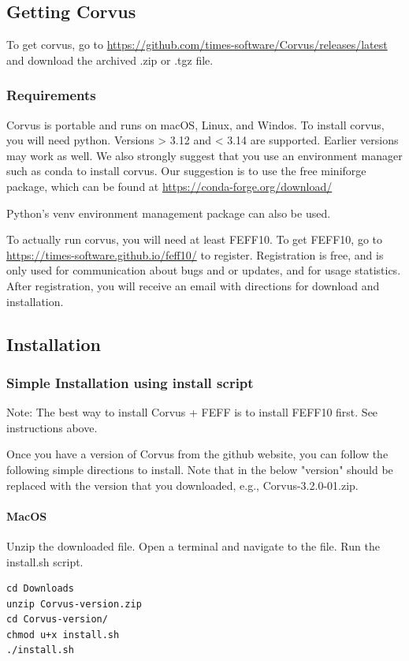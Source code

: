 \subsection{Getting Corvus}
To get corvus, go to 
\url{https://github.com/times-software/Corvus/releases/latest}
and download the archived .zip or .tgz file.

\subsubsection{Requirements}
Corvus is portable and runs on macOS, Linux, and Windos. 
To install corvus, you will need python. Versions > 3.12 and < 3.14 are supported. Earlier versions may work as well. We also strongly suggest that you use
an environment manager such as conda to install corvus. Our suggestion is to
use the free miniforge package, which can be found at \url{https://conda-forge.org/download/}

Python's venv environment management package can also be used.

To actually run corvus, you will need at least FEFF10. To get FEFF10, go to \url{https://times-software.github.io/feff10/} to register. Registration is free,
and is only used for communication about bugs and or updates, and for usage statistics. After registration, you will receive an email with directions for 
download and installation.

\subsection{Installation}

\subsubsection{Simple Installation using install script}
Note: The best way to install Corvus + FEFF is to install FEFF10 first. See instructions above. 

Once you have a version of Corvus from the github website, you can follow the following simple directions to install. Note that in the below "version" should be
replaced with the version that you downloaded, e.g., Corvus-3.2.0-01.zip.

\paragraph{MacOS} Unzip the downloaded file. Open a terminal and navigate to the file. Run the install.sh script.
\begin{verbatim}
cd Downloads
unzip Corvus-version.zip
cd Corvus-version/
chmod u+x install.sh
./install.sh
\end{verbatim}

